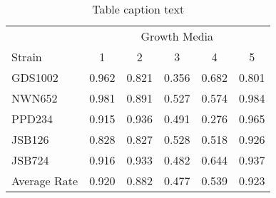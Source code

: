 \begin{table} 
\label{tab:template} 
\centering
\caption{Table caption text}
\begin{tabular}{l c c c c c} 
\toprule
& \multicolumn{5}{c}{Growth Media} \\ 
Strain & 1 & 2 & 3 & 4 & 5\\ 
\midrule 
GDS1002 & 0.962 & 0.821 & 0.356 & 0.682 & 0.801\\
NWN652 & 0.981 & 0.891 & 0.527 & 0.574 & 0.984\\ 
PPD234 & 0.915 & 0.936 & 0.491 & 0.276 & 0.965\\ 
JSB126 & 0.828 & 0.827 & 0.528 & 0.518 & 0.926\\ 
JSB724 & 0.916 & 0.933 & 0.482 & 0.644 & 0.937\\ 
\midrule 
\midrule 
Average Rate & 0.920 & 0.882 & 0.477 & 0.539 & 0.923\\ 
\bottomrule
\end{tabular}
\end{table}




%
%
%
%




